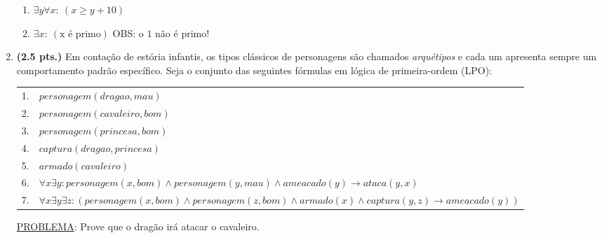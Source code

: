 \documentclass[a4paper,11pt]{article}
\begin{document}
\begin{enumerate}
\begin{enumerate}

       \item $\exists y \forall x: ~ (x  \geq y + 10)$
       
     \item $\exists x: ~ (\text{x é primo})$ \hspace{1cm} OBS: o $1$ não é primo!
 \end{enumerate} 
\item \label{P1} {\bf (2.5 pts.)} Em contação de estória infantis, os tipos clássicos de personagens são chamados {\em arquétipos} e cada um apresenta sempre 
um comportamento padrão específico. Seja o conjunto das seguintes fórmulas em lógica de primeira-ordem (LPO):\\
\begin{tabular}{ll}
\\  \hline \hline
  1. & $personagem(dragao, mau) $ \\
  2. & $personagem(cavaleiro, bom)$ \\
  3. & $personagem(princesa, bom)$ \\
  4. & $captura(dragao, princesa)$ \\
  5. & $armado(cavaleiro)$\\
  6. & $\forall x \exists y: personagem(x, bom) \wedge personagem(y, mau) \wedge ameacado(y) \rightarrow ataca(y, x)$ \\
  7. & $\forall x \exists y \exists z: (personagem(x, bom) \wedge personagem(z, bom) \wedge armado(x) \wedge captura(y, z) \rightarrow ameacado(y) )$ \\
    \hline \hline
 \end{tabular}

\vskip 0.2cm
\underline{PROBLEMA}: Prove que o dragão irá atacar o cavaleiro.


\end{enumerate}
\end{document}
